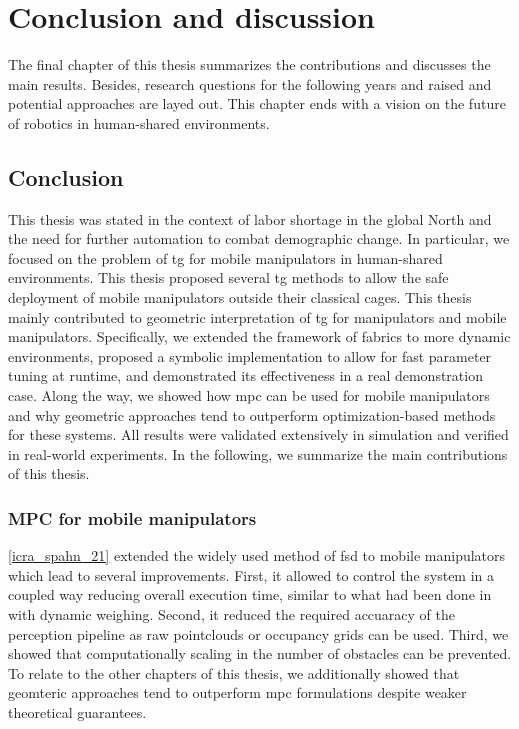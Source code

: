 \chapter{Conclusion and discussion}
\label{cha:conclusion_and_discussion}

The final chapter of this thesis summarizes the contributions and discusses the
main results. Besides, research questions for the following years and raised and
potential approaches are layed out. This chapter ends with a vision on the
future of robotics in human-shared environments.

\newpage

\section{Conclusion}
\label{sec:conclusion}

This thesis was stated in the context of labor shortage in the global North and
the need for further automation to combat demographic change. In particular, we
focused on the problem of \ac{tg} for mobile manipulators in human-shared
environments. This thesis proposed several \ac{tg} methods to allow the safe
deployment of mobile manipulators outside their classical cages.
This thesis mainly contributed to geometric interpretation of \ac{tg} for
manipulators and mobile manipulators. Specifically, we extended the framework of
\ac{fabrics} to more dynamic environments, proposed a symbolic implementation to
allow for fast parameter tuning at runtime, and demonstrated its effectiveness
in a real demonstration case. Along the way, we showed how \ac{mpc} can be used
for mobile manipulators and why geometric approaches tend to outperform
optimization-based methods for these systems. All results were validated
extensively in simulation and verified in real-world experiments. In the
following, we summarize the main contributions of this thesis.

\subsection{MPC for mobile manipulators}
\label{sec:conclusion_mpc}

\cref{icra_spahn_21} extended the widely used method of \ac{fsd} to mobile
manipulators which lead to several improvements. First, it allowed to control
the system in a coupled way reducing overall execution time, similar to what had
been done in \cite{Avanzini2018} with dynamic weighing. Second, it reduced the
required accuaracy of the perception pipeline as raw pointclouds or occupancy
grids can be used. Third, we showed that computationally scaling in the number
of obstacles can be prevented. To relate to the other chapters of this thesis,
we additionally showed that geomteric approaches tend to outperform \ac{mpc}
formulations despite weaker theoretical guarantees.

